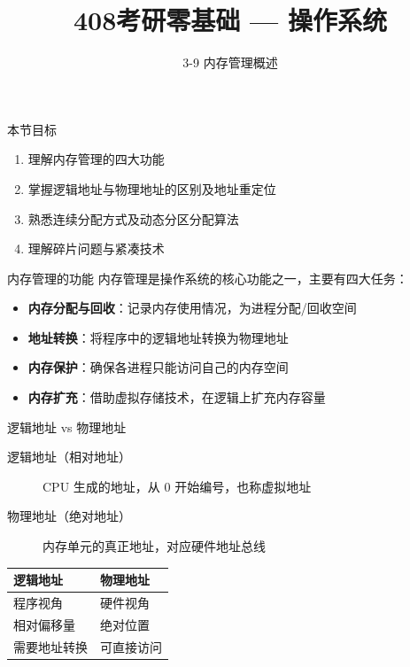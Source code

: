 \documentclass[10pt, aspectratio=169]{beamer}
\title{408考研零基础 --- 操作系统}
\subtitle{3-9 内存管理概述}
\author{}
\date{}
\begin{document}
\begin{frame}{本节目标}
    \begin{enumerate}
        \item 理解内存管理的四大功能
        \item 掌握逻辑地址与物理地址的区别及地址重定位
        \item 熟悉连续分配方式及动态分区分配算法
        \item 理解碎片问题与紧凑技术
    \end{enumerate}
\end{frame}

\begin{frame}{内存管理的功能}
    内存管理是操作系统的核心功能之一，主要有四大任务：
    \begin{itemize}
        \item \textbf{内存分配与回收}：记录内存使用情况，为进程分配/回收空间
        \item \textbf{地址转换}：将程序中的逻辑地址转换为物理地址
        \item \textbf{内存保护}：确保各进程只能访问自己的内存空间
        \item \textbf{内存扩充}：借助虚拟存储技术，在逻辑上扩充内存容量
    \end{itemize}
\end{frame}

\begin{frame}{逻辑地址 vs 物理地址}
    \begin{description}
        \item[逻辑地址（相对地址）] CPU 生成的地址，从 0 开始编号，也称虚拟地址
        \item[物理地址（绝对地址）] 内存单元的真正地址，对应硬件地址总线
    \end{description}
    \vspace{1em}
    \begin{center}
        \begin{tabular}{|l|l|}
            \hline
            \textbf{逻辑地址} & \textbf{物理地址} \\
            \hline
            程序视角 & 硬件视角 \\
            相对偏移量 & 绝对位置 \\
            需要地址转换 & 可直接访问 \\
            \hline
        \end{tabular}
    \end{center}
\end{frame}
\end{document}
